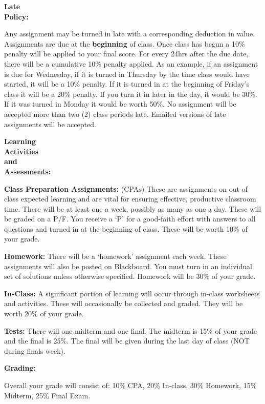 \documentclass{article}
\theoremstyle{plain}
\theoremstyle{definition}
\theoremstyle{remark}
\begin{document}
\vskip0.1in \noindent
\begin{minipage}[t]{1.3in}
\textbf{Late} \\ \textbf{Policy:} 
\end{minipage}
\begin{minipage}[t]{5.2in}
	Any assignment may be turned in late with a corresponding deduction in value. Assignments are due at the \textbf{beginning} of class. Once class has begun a 10\% penalty will be applied to your final score. For every 24hrs after the due date, there will be a cumulative 10\% penalty applied. As an example, if an assignment is due for Wednesday, if it is turned in Thursday by the time class would have started, it will be a 10\% penalty. If it is turned in at the beginning of Friday's class it will be a 20\% penalty. If you turn it in later in the day, it would be 30\%. If it was turned in Monday it would be worth 50\%. No assignment will be accepted more than two (2) class periods late. Emailed versions of late assignments will be accepted. 
\end{minipage}


\vskip0.1in \noindent
\begin{minipage}[t]{1.3in}
\textbf{Learning \\Activities \\and \\Assessments:}
\end{minipage}	
\begin{minipage}[t]{5.2in}
\vskip0.05in \indent \textbf{Class Preparation Assignments:} (CPAs) These are assignments on out-of class expected learning and are vital for ensuring effective, productive classroom time. There will be at least one a week, possibly as many as one a day. These will be graded on a P/F. You receive a `P' for a good-faith effort with answers to all questions and turned in at the beginning of class. These will be worth 10\% of your grade.

\vskip0.05in \indent \textbf{Homework:} There will be a `homework' assignment each week. These assignments will also be posted on Blackboard. You must turn in an individual set of solutions unless otherwise specified. Homework will be 30\% of your grade.

\vskip0.05in \indent \textbf{In-Class:} A significant portion of learning will occur through in-class worksheets and activities. These will occasionally be collected and graded. They will be worth 20\% of your grade.

\vskip0.05in \indent \textbf{Tests:} There will one midterm and one final. The midterm is 15\% of your grade and the final is 25\%. The final will be given during the last day of class (NOT during finals week).
\end{minipage}



\vskip0.1in \noindent
\begin{minipage}[t]{1.3in}
\textbf{Grading:} 
\end{minipage}
\begin{minipage}[t]{5.3in}
Overall your grade will consist of: 10\% CPA, 20\% In-class, 30\% Homework, 15\% Midterm, 25\% Final Exam. 
\end{minipage}
\end{document}
